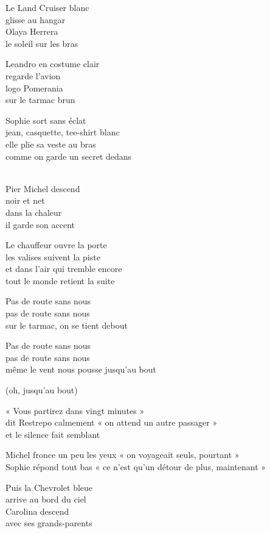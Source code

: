 \begin{lyrics}
Le Land Cruiser blanc\\
glisse au hangar\\
Olaya Herrera\\
le soleil sur les bras

Leandro en costume clair\\
regarde l’avion\\
logo Pomerania\\
sur le tarmac brun

Sophie sort sans éclat\\
jean, casquette, tee-shirt blanc\\
elle plie sa veste au bras\\
comme on garde un secret dedans

\\
Pier Michel descend\\
noir et net\\
dans la chaleur\\
il garde son accent

Le chauffeur ouvre la porte\\
les valises suivent la piste\\
et dans l’air qui tremble encore\\
tout le monde retient la suite

Pas de route sans nous\\
pas de route sans nous\\
sur le tarmac, on se tient debout

Pas de route sans nous\\
pas de route sans nous\\
même le vent nous pousse jusqu’au bout

(oh, jusqu’au bout)

« Vous partirez dans vingt minutes »\\
dit Restrepo calmement
« on attend un autre passager »\\
et le silence fait semblant

Michel fronce un peu les yeux
« on voyageait seuls, pourtant »\\
Sophie répond tout bas
« ce n’est qu’un détour de plus, maintenant »

Puis la Chevrolet bleue\\
arrive au bord du ciel\\
Carolina descend\\
avec ses grands-parents


\end{lyrics}
